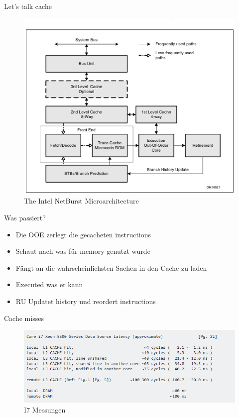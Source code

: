 \documentclass[11pt]{beamer}
\begin{document}
\begin{frame}
Let's talk cache
\begin{figure}[hbtp]
\centering
\includegraphics[scale=.3]{netburst.png}
\caption{The Intel NetBurst Microarchitecture}
\end{figure}
\end{frame}

\begin{frame}{Was passiert?}
\begin{itemize}
\item Die OOE zerlegt die gecacheten instructions
\item Schaut nach was für memory genutzt wurde
\item Fängt an die wahrscheinlichsten Sachen in den Cache zu laden
\item Executed was er kann
\item RU Updatet history und reordert instructions
\end{itemize}
\end{frame}

\begin{frame}{Cache misses}
\begin{figure}[hbtp]
\centering
\includegraphics[scale=.5]{latency.png}
\caption{I7 Messungen}
\end{figure}
\end{frame}
\end{document}
